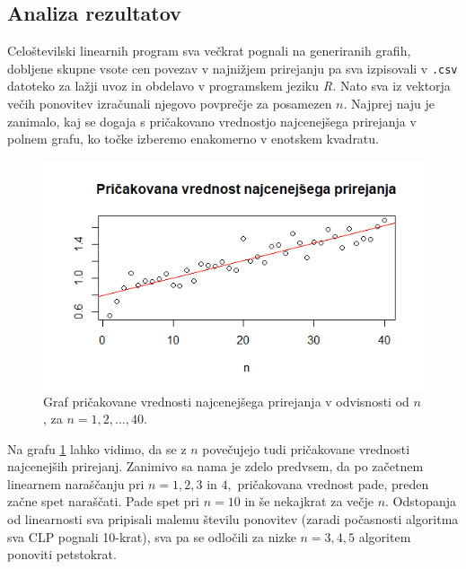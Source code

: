 \documentclass[a4paper, 11pt]{article}
\begin{document}
\subsection{Analiza rezultatov}
Celoštevilski linearnih program sva večkrat pognali na generiranih grafih, dobljene skupne vsote cen povezav v najnižjem prirejanju pa sva izpisovali v \texttt{.csv} datoteko za lažji uvoz in obdelavo v programskem jeziku \emph{R.}
Nato sva iz vektorja večih ponovitev izračunali njegovo povprečje za posamezen $n$.
Najprej naju je zanimalo, kaj se dogaja s pričakovano vrednostjo najcenejšega prirejanja v polnem grafu, ko točke izberemo enakomerno v enotskem kvadratu.

\begin{figure}[h!]
    \includegraphics[scale=0.6]{pricak_vred_n_od_1_do_40}
    \centering
    \caption{Graf pričakovane vrednosti najcenejšega prirejanja v odvisnosti od $n$, za $n=1,2,\ldots,40$.}
    \label{fig:pv1-40}
\end{figure}

Na grafu \ref{fig:pv1-40} lahko vidimo, da se z $n$ povečujejo tudi pričakovane vrednosti najcenejših prirejanj.
Zanimivo sa nama je zdelo predvsem, da po začetnem linearnem naraščanju pri $n=1,2,3$ in $4,$ pričakovana vrednost pade, preden začne spet naraščati.
Pade spet pri $n=10$ in še nekajkrat za večje $n.$
Odstopanja od linearnosti sva pripisali malemu številu ponovitev (zaradi počasnosti algoritma sva CLP pognali 10-krat), sva pa se odločili za nizke $n=3,4,5$ algoritem ponoviti petstokrat.
\end{document}
